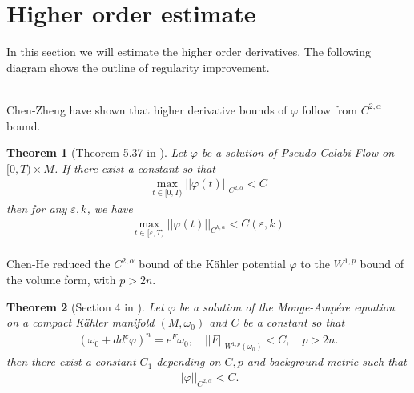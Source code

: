 \documentclass[11pt]{amsart}
\newtheorem{thm}{Theorem}[section]
\numberwithin{equation}{section}
\newcommand \eps{\varepsilon}
\begin{document}
\section{Higher order estimate\\}\label{Sec3}

In this section we will estimate the higher order derivatives.  The following diagram shows the outline of regularity improvement.  \\

 \\



Chen-Zheng \cite{Chen-Zheng} have shown that higher derivative bounds of $\varphi$ follow from $C^{2,\alpha}$ bound. 

\begin{thm}[Theorem 5.37 in \cite{Chen-Zheng}]\label{TM31}
	Let $\varphi$ be a solution of Pseudo Calabi Flow on $[0,T)\times M$. If there exist a constant so that 
	\begin{align}
		\max_{t\in [0,T)} ||\varphi(t)||_{C^{2,\alpha}}< C
	\end{align}
	then for any $\eps,k$, we have 
	\begin{align}
		\max_{t\in [\eps ,T)} ||\varphi(t)||_{C^{k,\alpha}}< C (\eps,k)\\
	\end{align}
\end{thm}
Chen-He reduced the $C^{2,\alpha}$ bound of the K\"ahler potential $\varphi$ to the $W^{1,p}$ bound of the volume form,  with $p>2n$.
\begin{thm}[Section 4 in \cite{ChHe2011}]\label{TM32}
	Let $\varphi$ be a solution of the Monge-Amp\'ere equation on a compact K\"ahler manifold $(M,\omega_0)$ and $C$ be a constant so that 
	\begin{align}\label{equa34}
		(\omega_0+dd^c \varphi)^n=e^F \omega_0, \quad ||F||_{W^{1,p}(\omega_0)}<C , \quad p>2n.
	\end{align}
	then there exist a constant $C_1$ depending on $C,p$ and background metric such that 
	\begin{align}
		||\varphi||_{C^{2,\alpha}} < C. 
	\end{align}\\
\end{thm}
\end{document}
